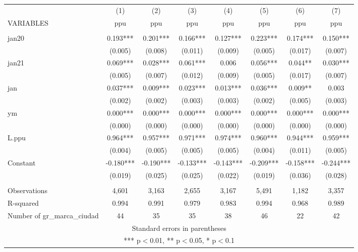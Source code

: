 \begin{tabular}{lccccccc} \hline
 & (1) & (2) & (3) & (4) & (5) & (6) & (7) \\
VARIABLES & ppu & ppu & ppu & ppu & ppu & ppu & ppu \\ \hline
 &  &  &  &  &  &  &  \\
jan20 & 0.193*** & 0.201*** & 0.166*** & 0.127*** & 0.223*** & 0.174*** & 0.150*** \\
 & (0.005) & (0.008) & (0.011) & (0.009) & (0.005) & (0.017) & (0.007) \\
jan21 & 0.069*** & 0.028*** & 0.061*** & 0.006 & 0.056*** & 0.044** & 0.030*** \\
 & (0.005) & (0.007) & (0.012) & (0.009) & (0.005) & (0.017) & (0.007) \\
jan & 0.037*** & 0.009*** & 0.023*** & 0.013*** & 0.036*** & 0.009** & 0.003 \\
 & (0.002) & (0.002) & (0.003) & (0.003) & (0.002) & (0.005) & (0.003) \\
ym & 0.000*** & 0.000*** & 0.000*** & 0.000*** & 0.000*** & 0.000*** & 0.000*** \\
 & (0.000) & (0.000) & (0.000) & (0.000) & (0.000) & (0.000) & (0.000) \\
L.ppu & 0.964*** & 0.957*** & 0.971*** & 0.974*** & 0.960*** & 0.944*** & 0.959*** \\
 & (0.004) & (0.005) & (0.005) & (0.005) & (0.004) & (0.011) & (0.005) \\
Constant & -0.180*** & -0.190*** & -0.133*** & -0.143*** & -0.209*** & -0.158*** & -0.244*** \\
 & (0.019) & (0.025) & (0.025) & (0.022) & (0.019) & (0.036) & (0.028) \\
 &  &  &  &  &  &  &  \\
Observations & 4,601 & 3,163 & 2,655 & 3,167 & 5,491 & 1,182 & 3,357 \\
R-squared & 0.994 & 0.991 & 0.979 & 0.983 & 0.994 & 0.968 & 0.989 \\
 Number of gr\_marca\_ciudad & 44 & 35 & 35 & 38 & 46 & 22 & 42 \\ \hline
\multicolumn{8}{c}{ Standard errors in parentheses} \\
\multicolumn{8}{c}{ *** p$<$0.01, ** p$<$0.05, * p$<$0.1} \\
\end{tabular}
